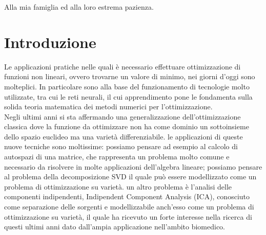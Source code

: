 \documentclass[a4paper, 12pt]{article}
\begin{document}
\clearpage
\begin{center}
    \thispagestyle{empty}
    \vspace*{\fill}
    Alla mia famiglia ed alla loro estrema pazienza.
    \vspace*{\fill}
\end{center}
\clearpage


\newpage

\renewcommand{\contentsname}{Contenuti}
\tableofcontents

\newpage

\section{Introduzione}
Le applicazioni pratiche nelle quali è necessario effettuare ottimizzazione di funzioni non lineari, ovvero trovarne un valore di minimo, nei giorni d'oggi sono molteplici. In particolare sono alla base del funzionamento di tecnologie molto utilizzate, tra cui le reti neurali, il cui apprendimento pone le fondamenta sulla solida teoria matematica dei metodi numerici per l'ottimizzazione.\\
Negli ultimi anni si sta affermando una generalizzazione dell'ottimizzazione classica dove la funzione da ottimizzare non ha come dominio un sottoinsieme dello spazio euclideo ma una varietà differenziabile. le applicazioni di queste nuove tecniche sono moltissime: possiamo pensare ad esempio al calcolo di autospazi di una matrice, che rappresenta un problema molto comune e necessario da risolvere in molte applicazioni dell'algebra lineare; possiamo pensare al problema della decomposizione SVD il quale può essere modellizzato come un problema di ottimizzazione su varietà. un altro problema è l'analisi delle componenti indipendenti, Indipendent Component Analysis (ICA), conosciuto come separazione delle sorgenti e modellizzabile anch'esso come un problema di ottimizzazione su varietà, il quale ha ricevuto un forte interesse nella ricerca di questi ultimi anni dato dall'ampia applicazione nell'ambito biomedico.\\
\end{document}
